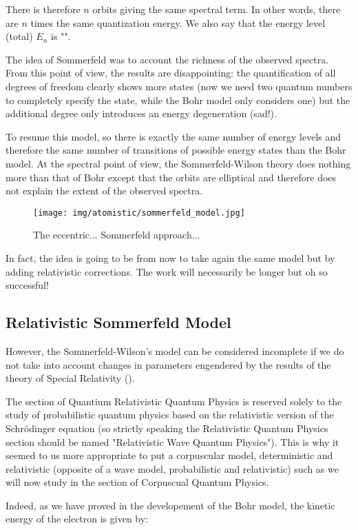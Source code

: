 	There is therefore $n$ orbits giving the same spectral term. In other words, there are $n$ times the same quantization energy. We also say that the energy level (total) $E_n$ is "".
	
	The idea of Sommerfeld was to account the richness of the observed spectra. From this point of view, the results are disappointing: the quantification of all degrees of freedom clearly shows more states (now we need two quantum numbers to completely specify the state, while the Bohr model only considers one) but the additional degree only introduces an energy degeneration (sad!).
	
	To resume this model, so there is exactly the same number of energy levels and therefore the same number of transitions of possible energy states than the Bohr model. At the spectral point of view, the Sommerfeld-Wilson theory does nothing more than that of Bohr except that the orbits are elliptical and therefore does not explain the extent of the observed spectra.
	\begin{figure}[H]
		\centering
		\texttt{[image: img/atomistic/sommerfeld\_model.jpg]}
		\caption{The eccentric... Sommerfeld approach...}
	\end{figure}
	In fact, the idea is going to be from now to take again the same model but by adding relativistic corrections. The work will necessarily be longer but oh so successful!
	
	\subsection{Relativistic Sommerfeld Model}
	However, the Sommerfeld-Wilson's model can be considered incomplete if we do not take into account changes in parameters engendered by the results of the theory of Special Relativity ().
	
	\begin{tcolorbox}[title=Remark,colframe=black,arc=10pt]
	The section of Quantium Relativistic Quantum Physics is reserved solely to the study of probabilistic quantum physics based on the relativistic version of the Schrödinger equation (so strictly speaking the Relativistic Quantum Physics section should be named "Relativistic Wave Quantum Physics"). This is why it seemed to us more appropriate to put a corpuscular model, deterministic and relativistic (opposite of a wave model, probabilistic and relativistic) such as we will now study in the section of Corpuscual Quantum Physics.
	\end{tcolorbox}
	Indeed, as we have proved in the developement of the Bohr model, the kinetic energy of the electron is given by:
	
